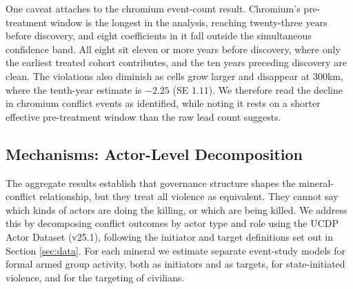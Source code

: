 \documentclass[11pt]{article}
\begin{document}
One caveat attaches to the chromium event-count result. Chromium's pre-treatment window is the longest in the analysis, reaching twenty-three years before discovery, and eight coefficients in it fall outside the simultaneous confidence band. All eight sit eleven or more years before discovery, where only the earliest treated cohort contributes, and the ten years preceding discovery are clean. The violations also diminish as cells grow larger and disappear at 300km, where the tenth-year estimate is $-2.25$ (SE $1.11$). We therefore read the decline in chromium conflict events as identified, while noting it rests on a shorter effective pre-treatment window than the raw lead count suggests.


\subsection{Mechanisms: Actor-Level Decomposition}
\label{sec:mechanisms}

The aggregate results establish that governance structure shapes the mineral-conflict relationship, but they treat all violence as equivalent. They cannot say which kinds of actors are doing the killing, or which are being killed. We address this by decomposing conflict outcomes by actor type and role using the UCDP Actor Dataset (v25.1), following the initiator and target definitions set out in Section \ref{sec:data}. For each mineral we estimate separate event-study models for formal armed group activity, both as initiators and as targets, for state-initiated violence, and for the targeting of civilians.
\end{document}
